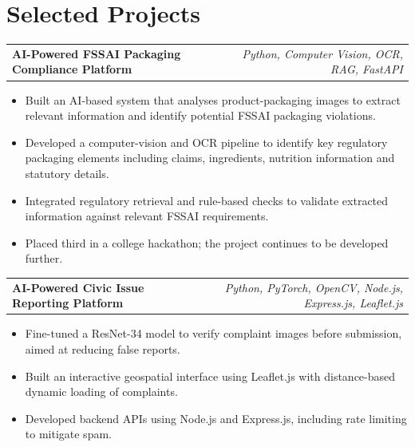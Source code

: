 \documentclass[a4paper,10pt]{article}
\begin{document}
\section{Selected Projects}
\begin{tabularx}{\linewidth}{ @{}l r@{} }
\textbf{AI-Powered FSSAI Packaging Compliance Platform} & \hfill \scriptsize{\textit{Python, Computer Vision, OCR, RAG, FastAPI}} \\[2pt]
\end{tabularx}
\begin{minipage}[t]{\linewidth}
\begin{itemize}[nosep,after=\strut, leftmargin=2.3em, itemsep=1.8pt,label=\textbullet]
\item Built an AI-based system that analyses product-packaging images to extract relevant information and identify potential FSSAI packaging violations.
\item Developed a computer-vision and OCR pipeline to identify key regulatory packaging elements including claims, ingredients, nutrition information and statutory details.
\item Integrated regulatory retrieval and rule-based checks to validate extracted information against relevant FSSAI requirements.
\item Placed third in a college hackathon; the project continues to be developed further.
\end{itemize}
\end{minipage}
\vspace{2pt}

\begin{tabularx}{\linewidth}{ @{}l r@{} }
\textbf{AI-Powered Civic Issue Reporting Platform} & \hfill \scriptsize{\textit{Python, PyTorch, OpenCV, Node.js, Express.js, Leaflet.js}} \\[2pt]
\end{tabularx}
\begin{minipage}[t]{\linewidth}
\begin{itemize}[nosep,after=\strut, leftmargin=2.3em, itemsep=1.8pt,label=\textbullet]
\item Fine-tuned a ResNet-34 model to verify complaint images before submission, aimed at reducing false reports.
\item Built an interactive geospatial interface using Leaflet.js with distance-based dynamic loading of complaints.
\item Developed backend APIs using Node.js and Express.js, including rate limiting to mitigate spam.
\end{itemize}
\end{minipage}
\vspace{2pt}
\end{document}
